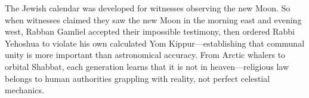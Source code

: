 The Jewish calendar was developed for witnesses observing the new Moon. So when witnesses claimed they saw the new Moon \QSOpen{}in the morning east and evening west,\QSClose{} Rabban Gamliel accepted their impossible testimony, then ordered Rabbi Yehoshua to violate his own calculated Yom Kippur—establishing that communal unity is more important than astronomical accuracy. From Arctic whalers to orbital Shabbat, each generation learns that \QSOpen{}it is not in heaven\QSClose{}—religious law belongs to human authorities grappling with reality, not perfect celestial mechanics.